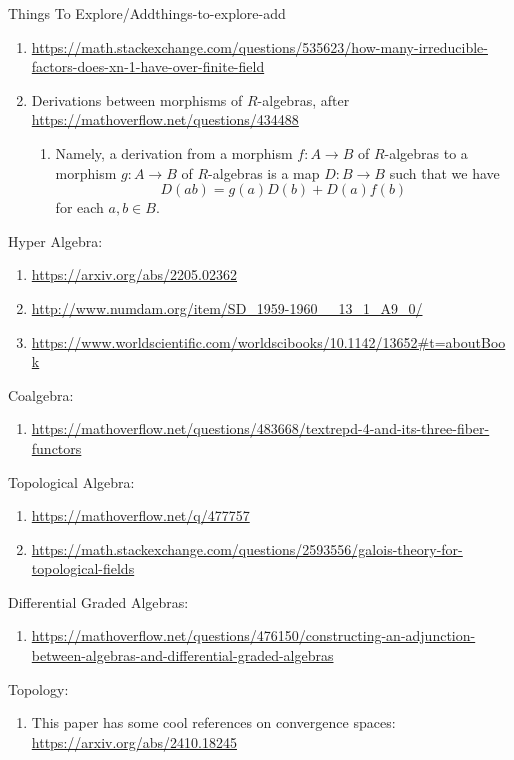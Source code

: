 \begin{remark}{Things To Explore/Add}{things-to-explore-add}
\begin{enumerate}
        \item \url{https://math.stackexchange.com/questions/535623/how-many-irreducible-factors-does-xn-1-have-over-finite-field}
        \item Derivations between morphisms of $R$-algebras, after \url{https://mathoverflow.net/questions/434488}
            \begin{enumerate}
                \item Namely, a derivation from a morphism $f\colon A\to B$ of $R$-algebras to a morphism $g\colon A\to B$ of $R$-algebras is a map $D\colon B\to B$ such that we have
                    \[
                        D(ab)%
                        =%
                        g(a)D(b)%
                        +%
                        D(a)f(b)%
                    \]%
                    for each $a,b\in B$.
            \end{enumerate}
    \end{enumerate}
    Hyper Algebra:
    \begin{enumerate}
        \item \url{https://arxiv.org/abs/2205.02362}
        \item \url{http://www.numdam.org/item/SD_1959-1960__13_1_A9_0/}
        \item \url{https://www.worldscientific.com/worldscibooks/10.1142/13652#t=aboutBook}
    \end{enumerate}
    Coalgebra:
    \begin{enumerate}
        \item \url{https://mathoverflow.net/questions/483668/textrepd-4-and-its-three-fiber-functors}
    \end{enumerate}
    Topological Algebra:
    \begin{enumerate}
        \item \url{https://mathoverflow.net/q/477757}
        \item \url{https://math.stackexchange.com/questions/2593556/galois-theory-for-topological-fields}
    \end{enumerate}
    Differential Graded Algebras:
    \begin{enumerate}
        \item \url{https://mathoverflow.net/questions/476150/constructing-an-adjunction-between-algebras-and-differential-graded-algebras}
    \end{enumerate}
    Topology:
    \begin{enumerate}
        \item This paper has some cool references on convergence spaces: \url{https://arxiv.org/abs/2410.18245}

\end{enumerate}
\end{remark}
